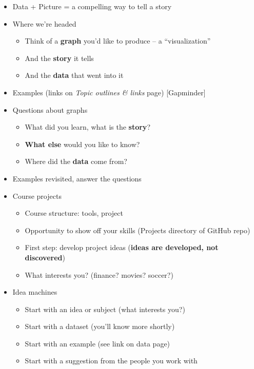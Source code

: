 \documentclass[11pt]{article}
\begin{document}
\begin{itemize}

\item Data + Picture = a compelling way to tell a story

\item Where we're headed
\begin{itemize}
\item Think of a {\bf graph\/} you'd like to produce -- a ``visualization''
\item And the {\bf story\/} it tells
\item And the {\bf data\/} that went into it
\end{itemize}

\item Examples (links on {\it Topic outlines \& links\/} page) [Gapminder]

\item Questions about graphs
\begin{itemize}
\item What did you learn, what is the {\bf story\/}?
\item {\bf What else} would you like to know?
\item Where did the {\bf data\/} come from?
\end{itemize}

\item Examples revisited, answer the questions

\item Course projects
\begin{itemize}
\item Course structure:  tools, project
\item Opportunity to show off your skills (Projects directory of GitHub repo)
\item First step:  develop project ideas ({\bf ideas are developed, not discovered})
\item What interests {you}? (finance? movies?  soccer?)
\end{itemize}

\item Idea machines
\begin{itemize}
\item Start with an idea or subject (what interests you?)
\item Start with a dataset (you'll know more shortly)
\item Start with an example (see link on data page)
\item Start with a suggestion from the people you work with
\end{itemize}


\end{itemize}
\end{document}
